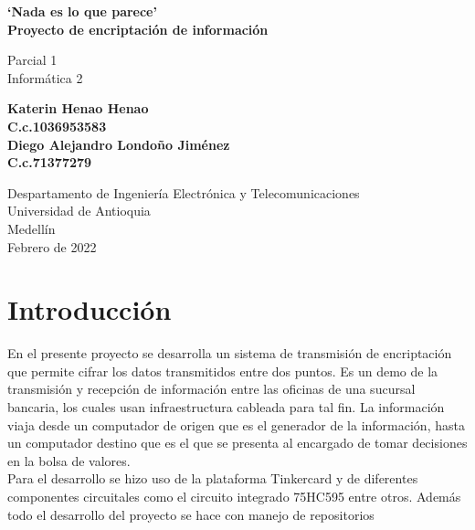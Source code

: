 \documentclass{article}
\begin{document}
\begin{titlepage}
    \begin{center}
        \vspace*{2cm}
            
        \Huge
        \textbf{`Nada es lo que parece' \\
        Proyecto de encriptación de información}
            
        \vspace{0.5cm}
        \LARGE
        Parcial 1\\
        Informática 2

        
            
        \vspace{2,5cm}
            
        \textbf{
        Katerin Henao Henao\\
        C.c.1036953583\\
        Diego Alejandro Londoño Jiménez\\
        C.c.71377279\\
        }
            
        \vfill
            
        \vspace{2,5cm}
            
        \Large
        Despartamento de Ingeniería Electrónica y Telecomunicaciones\\
        Universidad de Antioquia\\
        Medellín\\
        Febrero de 2022
            
    \end{center}
\end{titlepage}

\tableofcontents
\newpage
\section{Introducción}
\label{intro}
En el presente proyecto se desarrolla un sistema de transmisión de encriptación que permite cifrar los datos transmitidos entre dos puntos. Es un demo de la transmisión y recepción de información entre las oficinas de una sucursal bancaria, los cuales usan infraestructura cableada para tal fin. La información viaja desde un computador de origen que es el generador de la información, hasta un computador destino que es el que se presenta al encargado de tomar decisiones en la bolsa de valores. \\
Para el desarrollo se hizo uso de la plataforma Tinkercard y de diferentes componentes circuitales como el circuito integrado 75HC595 entre otros. Además todo el desarrollo del proyecto se hace con manejo de repositorios
\end{document}
